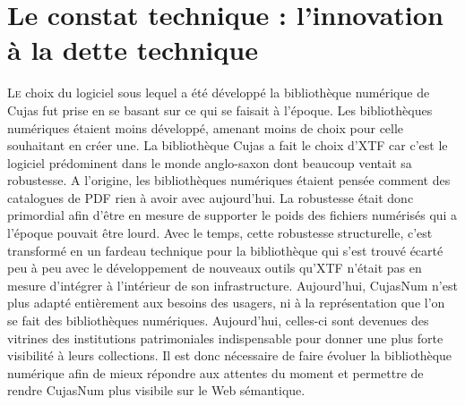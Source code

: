 \chapter[Le constat technique]{Le constat technique : l'innovation à la dette technique}

\lettrine{L}e choix du logiciel sous lequel a été développé la bibliothèque numérique de Cujas fut prise en se basant sur ce qui se faisait à l'époque. Les bibliothèques numériques étaient moins développé, amenant moins de choix pour celle souhaitant en créer une. La bibliothèque Cujas a fait le choix d'XTF car c'est le logiciel prédominent dans le monde anglo-saxon dont beaucoup ventait sa robustesse. A l'origine, les bibliothèques numériques étaient pensée comment des catalogues de PDF rien à avoir avec aujourd'hui. La robustesse était donc primordial afin d'être en mesure de supporter le poids des fichiers numérisés qui a l'époque pouvait être lourd. Avec le temps, cette robustesse structurelle, c'est transformé en un fardeau technique pour la bibliothèque qui s'est trouvé écarté peu à peu avec le développement de nouveaux outils qu'XTF n'était pas en mesure d'intégrer à l'intérieur de son infrastructure. Aujourd'hui, CujasNum n'est plus adapté entièrement aux besoins des usagers, ni à la représentation que l'on se fait des bibliothèques numériques. Aujourd'hui, celles-ci sont devenues des vitrines des institutions patrimoniales indispensable pour donner une plus forte visibilité à leurs collections. Il est donc nécessaire de faire évoluer la bibliothèque numérique afin de mieux répondre aux attentes du moment et permettre de rendre CujasNum plus visibile sur le Web sémantique.



